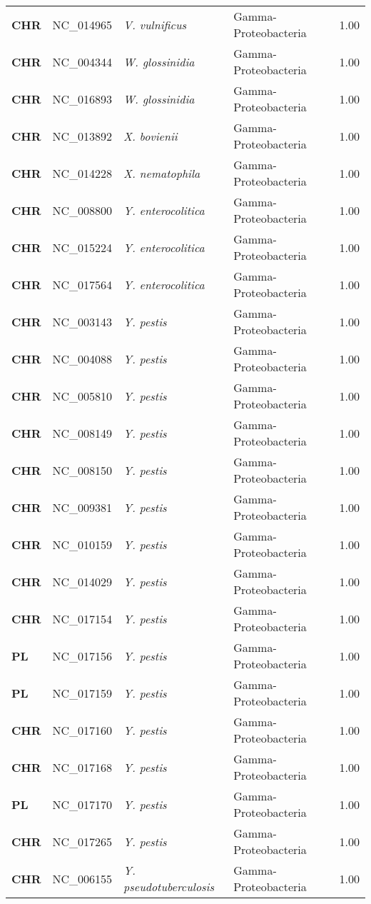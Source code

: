 \begin{adjustwidth}{-3cm}{2cm}
{\begin{supertabular}{>{\bfseries}l|p{0.1\textwidth}p{0.14\textwidth}l|l}
CHR & NC\_014965 & \textit{V. vulnificus} & Gamma-Proteobacteria & 1.00\\
CHR & NC\_004344 & \textit{W. glossinidia} & Gamma-Proteobacteria & 1.00\\
CHR & NC\_016893 & \textit{W. glossinidia} & Gamma-Proteobacteria & 1.00\\
CHR & NC\_013892 & \textit{X. bovienii} & Gamma-Proteobacteria & 1.00\\
CHR & NC\_014228 & \textit{X. nematophila} & Gamma-Proteobacteria & 1.00\\
CHR & NC\_008800 & \textit{Y. enterocolitica} & Gamma-Proteobacteria & 1.00\\
CHR & NC\_015224 & \textit{Y. enterocolitica} & Gamma-Proteobacteria & 1.00\\
CHR & NC\_017564 & \textit{Y. enterocolitica} & Gamma-Proteobacteria & 1.00\\
CHR & NC\_003143 & \textit{Y. pestis} & Gamma-Proteobacteria & 1.00\\
CHR & NC\_004088 & \textit{Y. pestis} & Gamma-Proteobacteria & 1.00\\
CHR & NC\_005810 & \textit{Y. pestis} & Gamma-Proteobacteria & 1.00\\
CHR & NC\_008149 & \textit{Y. pestis} & Gamma-Proteobacteria & 1.00\\
CHR & NC\_008150 & \textit{Y. pestis} & Gamma-Proteobacteria & 1.00\\
CHR & NC\_009381 & \textit{Y. pestis} & Gamma-Proteobacteria & 1.00\\
CHR & NC\_010159 & \textit{Y. pestis} & Gamma-Proteobacteria & 1.00\\
CHR & NC\_014029 & \textit{Y. pestis} & Gamma-Proteobacteria & 1.00\\
CHR & NC\_017154 & \textit{Y. pestis} & Gamma-Proteobacteria & 1.00\\
PL & NC\_017156 & \textit{Y. pestis} & Gamma-Proteobacteria & 1.00\\
PL & NC\_017159 & \textit{Y. pestis} & Gamma-Proteobacteria & 1.00\\
CHR & NC\_017160 & \textit{Y. pestis} & Gamma-Proteobacteria & 1.00\\
CHR & NC\_017168 & \textit{Y. pestis} & Gamma-Proteobacteria & 1.00\\
PL & NC\_017170 & \textit{Y. pestis} & Gamma-Proteobacteria & 1.00\\
CHR & NC\_017265 & \textit{Y. pestis} & Gamma-Proteobacteria & 1.00\\
CHR & NC\_006155 & \textit{Y. pseudotuberculosis} & Gamma-Proteobacteria & 1.00\\

\end{supertabular}}
\end{adjustwidth}
